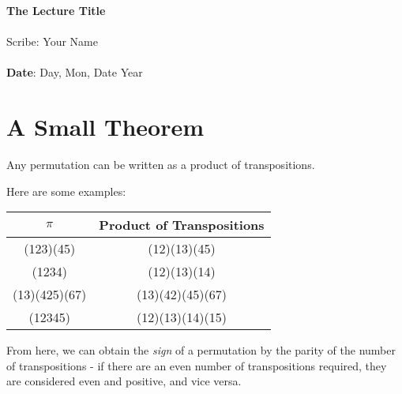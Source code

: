 \documentclass[11pt,twosided]{article}
\def\titlestring{The Lecture Title}
\def\scribestring{Your Name}
\def\datestring{Day, Mon, Date Year}
\begin{document}
\thispagestyle{plain}  %

\noindent
{\LARGE \textbf{\titlestring}}\\\\
%
{\Large Scribe: \scribestring}\\ \\
{\textbf{Date}: \datestring}


\noindent

\section{A Small Theorem}
\begin{theorem}
Any permutation can be written as a product of transpositions.
\end{theorem}

Here are some examples: 
\begin{center}
\begin{tabular}{c | c}
$\pi$ & Product of Transpositions \\ \hline 
(123)(45) & (12)(13)(45) \\
(1234) & (12)(13)(14) \\
(13)(425)(67) & (13)(42)(45)(67) \\
(12345) & (12)(13)(14)(15) \\
\end{tabular}
\end{center}

From here, we can obtain the \textit{sign} of a permutation by the parity of the number of transpositions - if there are an even number of transpositions required, they are considered even and positive, and vice versa. 
\end{document}
